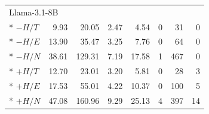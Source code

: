 \begin{longtable}{@{}lrrrrrrr@{}}
\midrule
\multicolumn{8}{l}{Llama-3.1-8B} \\*
\addlinespace
$-H/T$ & 9.93 & 20.05 & 2.47 & 4.54 & 0 & 31 & 0 \\*
$-H/E$ & 13.90 & 35.47 & 3.25 & 7.76 & 0 & 64 & 0 \\*
$-H/N$ & 38.61 & 129.31 & 7.19 & 17.58 & 1 & 467 & 0 \\*
$+H/T$ & 12.70 & 23.01 & 3.20 & 5.81 & 0 & 28 & 3 \\*
$+H/E$ & 17.53 & 55.01 & 4.22 & 10.37 & 0 & 100 & 5 \\*
$+H/N$ & 47.08 & 160.96 & 9.29 & 25.13 & 4 & 397 & 14 \\
\end{longtable}
\endgroup
